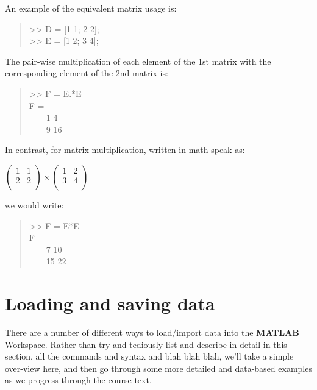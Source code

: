 \documentclass{tufte-book} %
\newenvironment{docspec}{\begin{quotation}\ttfamily\parskip0pt\parindent0pt\ignorespaces}{\end{quotation}}
\begin{document}
\vspace{1mm}
An example of the equivalent matrix usage is:

\begin{docspec}
>> D = [1 1; 2 2];\\
>> E = [1 2; 3 4];
\end{docspec}

The pair-wise multiplication of each element of the 1st matrix with the corresponding element of the 2nd matrix is:
\begin{docspec}
>> F = E.*E
\\
F =\\
\ \ \ \ 1     4\\
\ \ \ \ 9    16
\end{docspec}

In contrast, for matrix multiplication, written in math-speak as:

\vspace{2mm}
\(\begin{pmatrix}1 & 1 \\
2 & 2 \\
\end{pmatrix}\times\begin{pmatrix}1 & 2 \\
3 & 4 \\
\end{pmatrix}\)
\vspace{2mm}

we would write:

\begin{docspec}
>> F = E*E
\\
F =\\
\ \ \ \  7    10\\
\ \ \ \ 15    22
\end{docspec}


\newpage


\section{Loading and saving data}

There are a number of different ways to load/import data into the \textbf{MATLAB} \textsf{Workspace}. Rather than try and tediously list and describe in detail in this section, all the commands and syntax and blah blah blah, we'll take a simple over-view here, and then go through some more detailed and data-based examples as we progress through the course text.
\end{document}
